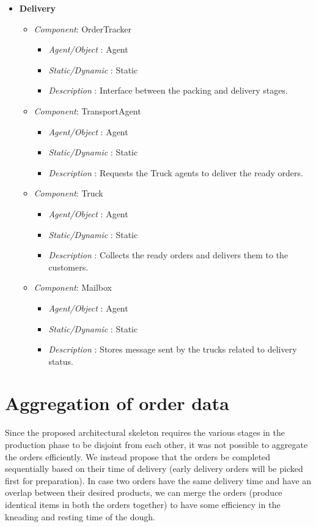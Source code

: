 \documentclass[11pt, a4paper]{article}
\begin{document}
\begin{itemize}
	\item \textbf{Delivery}
	\begin{itemize}
	\item \textit{Component}: OrderTracker
	\begin{itemize}
		\item \textit{Agent/Object} : Agent
		\item \textit{Static/Dynamic} : Static
		\item \textit{Description} : Interface between the packing and delivery stages.
	\end{itemize}
	\item \textit{Component}: TransportAgent
	\begin{itemize}
		\item \textit{Agent/Object} : Agent
		\item \textit{Static/Dynamic} : Static
		\item \textit{Description} : Requests the Truck agents to deliver the ready orders.
	\end{itemize}
	\item \textit{Component}: Truck
	\begin{itemize}
		\item \textit{Agent/Object} : Agent
		\item \textit{Static/Dynamic} : Static
		\item \textit{Description} : Collects the ready orders and delivers them to the customers.
	\end{itemize}
	\item \textit{Component}: Mailbox
	\begin{itemize}
		\item \textit{Agent/Object} : Agent
		\item \textit{Static/Dynamic} : Static
		\item \textit{Description} : Stores message sent by the trucks related to delivery status.
	\end{itemize}
	\end{itemize}
\end{itemize}


\newpage
\section{Aggregation of order data}

Since the proposed architectural skeleton requires the various stages in the production phase to be disjoint from each other, it was not possible to aggregate the orders efficiently. We instead propose that the orders be completed sequentially based on their time of delivery (early delivery orders will be picked first for preparation). In case two orders have the same delivery time and have an overlap between their desired products, we can merge the orders (produce identical items in both the orders together) to have some efficiency in the kneading and resting time of the dough. 
\end{document}
